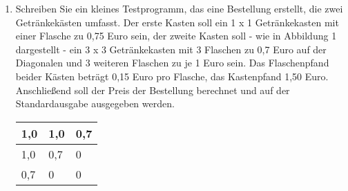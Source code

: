 \documentclass{bschlangaul-aufgabe}
\begin{document}
\begin{enumerate}

\item Schreiben Sie ein kleines Testprogramm, das eine Bestellung
erstellt, die zwei Getränkekästen umfasst. Der erste Kasten soll ein 1 x
1 Getränkekasten mit einer Flasche zu 0,75 Euro sein, der zweite Kasten
soll - wie in Abbildung 1 dargestellt - ein 3 x 3 Getränkekasten mit 3
Flaschen zu 0,7 Euro auf der Diagonalen und 3 weiteren Flaschen zu je 1
Euro sein. Das Flaschenpfand beider Kästen beträgt 0,15 Euro pro
Flasche, das Kastenpfand 1,50 Euro. Anschließend soll der Preis der
Bestellung berechnet und auf der Standardausgabe ausgegeben werden.

\begin{center}
\begin{tabular}{|l|l|l|}
\hline
1,0 & 1,0 & 0,7\\\hline
1,0 & 0,7 & 0\\\hline
0,7 & 0 & 0\\\hline
\end{tabular}
\end{center}

\begin{bAntwort}

\end{bAntwort}

\end{enumerate}
\end{document}
